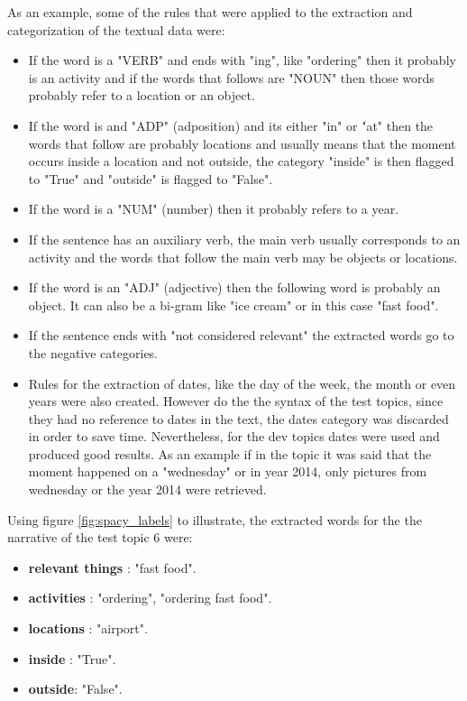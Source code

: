   \newpage
  
  As an example, some of the rules that were applied to the extraction and categorization of the textual data were:
  
  \begin{itemize}
    \itemsep0em
      \item  If the word is a "VERB" and ends with "ing", like "ordering" then it probably is an activity and if the words that follows are "NOUN" then those words probably refer to a location or an object.
      \item  If the word is and "ADP" (adposition) and its either "in" or "at" then the words that follow are probably locations and usually means that the moment occurs inside a location and not outside, the category "inside" is then flagged to "True" and "outside" is flagged to "False".
      \item If the word is a "NUM" (number) then it probably refers to a year.
      \item If the sentence has an auxiliary verb, the main verb usually corresponds to an activity and the words that follow the main verb may be objects or locations.
      \item If the word is an "ADJ" (adjective) then the following word is probably an object. It can also be a bi-gram like "ice cream" or in this case "fast food".
      \item If the sentence ends with "not considered relevant" the extracted words go to the negative categories.
      \item Rules for the extraction of dates, like the day of the week, the month or even years were also created. However do the the syntax of the test topics, since they had no reference to dates in the text, the dates category was discarded in order to save time. Nevertheless, for the dev topics dates were used and produced good results. As an example if in the topic it was said that the moment happened on a "wednesday" or in year 2014, only pictures from wednesday or the year 2014 were retrieved.

    \end{itemize}


Using figure \ref{fig:spacy_labels} to illustrate, the extracted words for the the narrative of the test topic 6  were:

    \begin{itemize}
        \item \textbf{relevant things} : "fast food".
        \item \textbf{activities} : "ordering", "ordering fast food".
        \item \textbf{locations} : "airport".
        \item \textbf{inside} : "True".
        \item \textbf{outside}: "False".
       
    \end{itemize}


